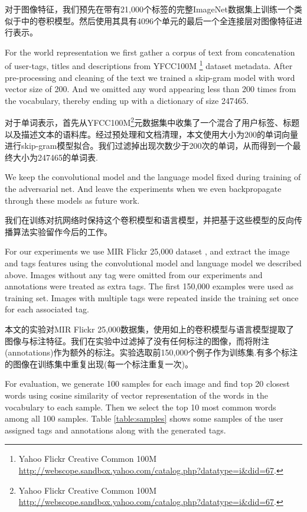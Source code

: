 \documentclass{article} %
\begin{document}
对于图像特征，我们预先在带有21,000个标签的完整ImageNet数据集\cite{RussakovskyFeiFei}上训练一个类似于\cite{Krizhevsky-2012}中的卷积模型。然后使用其具有4096个单元的最后一个全连接层对图像特征进行表示。

For the world representation we first gather a corpus of text from concatenation of user-tags, titles and descriptions from
YFCC100M \footnote{Yahoo Flickr Creative Common 100M \url{http://webscope.sandbox.yahoo.com/catalog.php?datatype=i&did=67}.}
dataset metadata. After pre-processing and cleaning of the text we trained a
skip-gram model \cite{mikolov-et-al-iclr2013} with word vector size of 200. And we omitted any word appearing
less than 200 times from the vocabulary,  thereby ending up with a dictionary of size 247465.


对于单词表示，首先从YFCC100M\footnote{Yahoo Flickr Creative Common 100M \url{http://webscope.sandbox.yahoo.com/catalog.php?datatype=i&did=67}.}元数据集中收集了一个混合了用户标签、标题以及描述文本的语料库。经过预处理和文档清理，本文使用大小为200的单词向量进行skip-gram模型拟合。我们过滤掉出现次数少于200次的单词，从而得到一个最终大小为247465的单词表.

We keep the convolutional model and the language model fixed during training of the adversarial net.
And leave the experiments when we even backpropagate through these models as future work.

我们在训练对抗网络时保持这个卷积模型和语言模型，并把基于这些模型的反向传播算法实验留作今后的工作。

For our experiments we use MIR Flickr 25,000 dataset \cite{huiskes08}, and extract the image and
tags features using the convolutional model and language model we described above.
Images without any tag were omitted from our experiments and annotations were treated as extra tags.
The first 150,000 examples were used as training set.
Images with multiple tags were repeated inside the training set once for each associated tag.

本文的实验对MIR Flickr 25,000数据集\cite{huiskes08}，使用如上的卷积模型与语言模型提取了图像与标注特征。我们在实验中过滤掉了没有任何标注的图像，而将附注(annotations)作为额外的标注。实验选取前150,000个例子作为训练集.有多个标注的图像在训练集中重复出现(每一个标注重复一次)。

For evaluation, we generate 100 samples for each image and find top 20 closest words
using cosine similarity of vector representation of the words in the vocabulary to each sample.
Then we select the top 10 most common words among all 100 samples.
Table \ref{table:samples} shows some samples of the user
assigned tags and annotations along with the generated tags.
\end{document}
